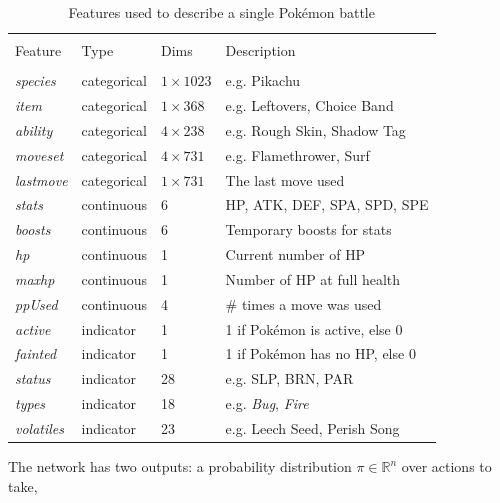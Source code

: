 \begin{table}[h]
\centering
    \begin{tabular}{llll}
    \hline \\
    Feature             & Type        & Dims            & Description                 \\
    \hline \\
    \emph{species}      & categorical & $1 \times 1023$ & e.g. Pikachu                \\
    \emph{item}         & categorical & $1 \times 368$  & e.g. Leftovers, Choice Band  \\
    \emph{ability}      & categorical & $4 \times 238$  & e.g. Rough Skin, Shadow Tag \\
    \emph{moveset}      & categorical & $4 \times 731$  & e.g. Flamethrower, Surf     \\
    \emph{lastmove}     & categorical & $1 \times 731$  & The last move used          \\
    \emph{stats}        & continuous  & 6               & \ac{HP}, \ac{ATK}, \ac{DEF}, \ac{SPA}, \ac{SPD}, \ac{SPE} \\
    \emph{boosts}       & continuous  & 6               & Temporary boosts for stats \\
    \emph{hp}           & continuous  & 1               & Current number of \ac{HP} \\
    \emph{maxhp}        & continuous  & 1               & Number of \ac{HP} at full health \\
    \emph{ppUsed}       & continuous  & 4               & \# times a move was used \\
    \emph{active}       & indicator   & 1               & 1 if Pokémon is active, else 0 \\
    \emph{fainted}      & indicator   & 1               & 1 if Pokémon has no \ac{HP}, else 0 \\
    \emph{status}       & indicator   & 28              & e.g. \ac{SLP}, \ac{BRN}, \ac{PAR} \\
    \emph{types}        & indicator   & 18              & e.g. \textit{Bug}, \textit{Fire} \\
    \emph{volatiles}    & indicator   & 23              & e.g. Leech Seed, Perish Song
    \end{tabular}
    \caption{Features used to describe a single Pokémon battle \cite{Lee_Togelius_2017}}
    \label{tbl:HuangLee-Pokemon-Table}
\end{table}
The network has two outputs: a probability distribution $\pi \in \mathbb{R}^n$ over actions to take, 
